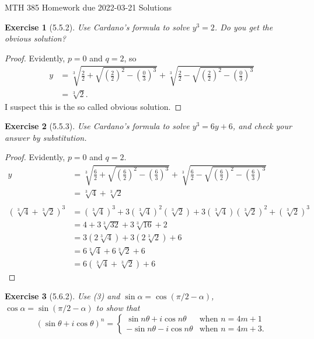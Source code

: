 \documentclass[12pt]{article}
\theoremstyle{plain}
\newtheorem{ex}{Exercise}
\begin{document}
MTH 385 \qquad Homework due 2022-03-21 Solutions

\begin{ex} [5.5.2]
  Use Cardano's formula to solve $y^3=2$. Do you get the obvious solution?
\end{ex}

\begin{proof}
  Evidently, $p=0$ and $q=2$, so
  \begin{align*}
    y &= \sqrt[3]{\frac{2}{2}+\sqrt{\left(\frac{2}{2}\right)^2-\left(\frac{0}{3}\right)^3}}+\sqrt[3]{\frac{2}{2}-\sqrt{\left(\frac{2}{2}\right)^2-\left(\frac{0}{3}\right)^3}} \\
      &= \sqrt[3]{2}.
  \end{align*}
  I suspect this is the so called obvious solution.
\end{proof}

\begin{ex} [5.5.3]
  Use Cardano's formula to solve $y^3=6y+6$, and check your answer by substitution.
\end{ex}

\begin{proof}
  Evidently, $p=0$ and $q=2$.
  \begin{align*}
    y &= \sqrt[3]{\frac{6}{2}+\sqrt{\left(\frac{6}{2}\right)^2-\left(\frac{6}{3}\right)^3}}+\sqrt[3]{\frac{6}{2}-\sqrt{\left(\frac{6}{2}\right)^2-\left(\frac{6}{3}\right)^3}} \\
      &= \sqrt[3]{4}+\sqrt[3]{2} \\
  \\
    (\sqrt[3]{4}+\sqrt[3]{2})^3 &= (\sqrt[3]{4})^3+3(\sqrt[3]{4})^2(\sqrt[3]{2})+3(\sqrt[3]{4})(\sqrt[3]{2})^2+(\sqrt[3]{2})^3 \\
                                &= 4+3\sqrt[3]{32}+3\sqrt[3]{16}+2 \\
                                &= 3(2\sqrt[3]{4})+3(2\sqrt[3]{2})+6 \\
                                &= 6\sqrt[3]{4}+6\sqrt[3]{2}+6 \\
                                &= 6(\sqrt[3]{4}+\sqrt[3]{2})+6
  \end{align*}
\end{proof}

\begin{ex} [5.6.2]
  Use (3) and $\sin\alpha=\cos(\pi/2-\alpha)$, $\cos\alpha=\sin(\pi/2-\alpha)$ to show that
  \[
    (\sin\theta+i\cos\theta)^n=\left\{\begin{array}{rl}
       \sin n\theta+i\cos n\theta & \mbox{when $n=4m+1$} \\
      -\sin n\theta-i\cos n\theta & \mbox{when $n=4m+3$.}
    \end{array} \right.
  \]
\end{ex}
\end{document}

